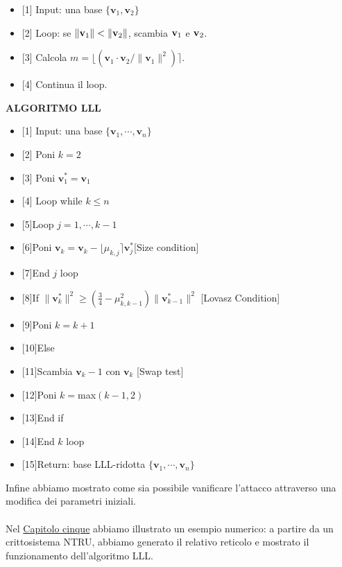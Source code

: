 \documentclass[a4paper,12pt]{report}
\theoremstyle{plain}
\theoremstyle{definition}
\theoremstyle{remark}
\begin{document}
\begin{itemize}
\item{[1]} Input: una base $\{\textbf{v}_1,\textbf{v}_2\}$
\item{[2]} Loop: se $\|\textbf v_1\|<\|\textbf v_2\|$, scambia $\textbf v_1$ e $\textbf v_2$.
\item{[3]} Calcola  $m=\lfloor (\textbf{v}_1\cdot\textbf{v}_2/\|\textbf{v}_1\|^2)\rceil.$
\item{[4]} Continua il loop.
\end{itemize}

\centerline{\textbf{ALGORITMO LLL}}
\begin{itemize}
\item{[1]} Input: una base $\{\textbf{v}_1,\cdots,\textbf{v}_n\}$
\item{[2]} Poni $k=2$
\item{[3]} Poni $\textbf{v}_1^*=\textbf{v}_1$
\item{[4]} Loop while $k\le n$
\item{[5]}\hspace{0.5cm}Loop $j=1,\cdots,k-1$
\item{[6]}\hspace{1cm}Poni $\textbf{v}_k=\textbf{v}_k-\lfloor\mu_{k,j}\rceil\textbf{v}_j^*$\hspace{1cm}[Size condition]
\item{[7]}\hspace{0.5cm}End $j$ loop 
\item{[8]}\hspace{0.5cm}If $\|\textbf{v}_k^*\|^2\ge(\frac{3}{4}-\mu_{k,k-1}^2)\|\textbf{v}_{k-1}^*\|^2$  [Lovasz Condition]
\item{[9]}\hspace{1cm}Poni $k=k+1$
\item{[10]}\hspace{0.3cm}Else 
\item{[11]}\hspace{1cm}Scambia $\textbf{v}_k-1$ con $\textbf{v}_k$ \hspace{1.5cm}[Swap test]
\item{[12]}\hspace{1cm}Poni $k=$max$(k-1,2)$
\item{[13]}\hspace{0.5cm}End if
\item{[14]}End $k$ loop
\item{[15]}Return: base LLL-ridotta $\{\textbf{v}_1,\cdots,\textbf{v}_n\}$


\end{itemize}
 Infine abbiamo mostrato come sia possibile vanificare l'attacco attraverso una modifica dei parametri iniziali.
\\ \\ Nel \underline {Capitolo cinque} abbiamo illustrato un esempio numerico: a partire da un crittosistema NTRU, abbiamo generato il relativo reticolo e mostrato il funzionamento dell'algoritmo LLL.
\end{document}
